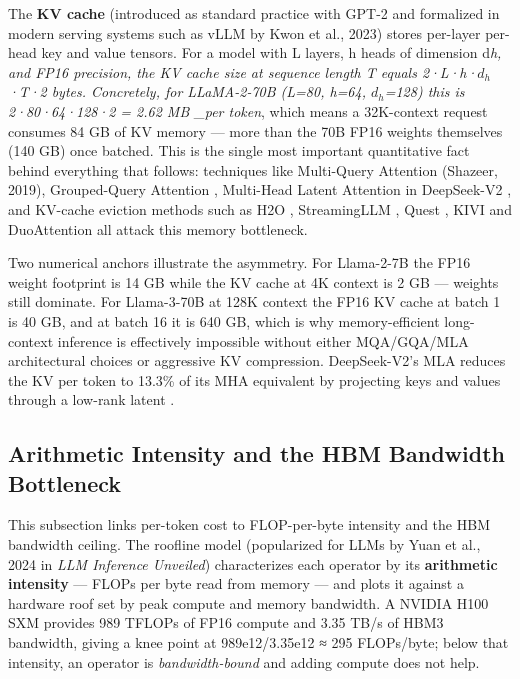 \documentclass{article}
\begin{document}
The \textbf{KV cache} (introduced as standard practice with GPT-2 and formalized in modern serving systems such as vLLM by Kwon et al., 2023) stores per-layer per-head key and value tensors. For a model with L layers, h heads of dimension d\emph{h, and FP16 precision, the KV cache size at sequence length T equals 2·L·h·\(d_h\)·T·2 bytes. Concretely, for LLaMA-2-70B (L=80, h=64, \(d_h\)=128) this is 2·80·64·128·2 = 2.62 MB \_per token}, which means a 32K-context request consumes 84 GB of KV memory --- more than the 70B FP16 weights themselves (140 GB) once batched. This is the single most important quantitative fact behind everything that follows: techniques like Multi-Query Attention (Shazeer, 2019), Grouped-Query Attention \citep{ainslie20232023}, Multi-Head Latent Attention in DeepSeek-V2 \citep{liu20242024}, and KV-cache eviction methods such as H2O \citep{zhang20232023}, StreamingLLM \citep{xiao2024efficientstreaming}, Quest \citep{tang20242024}, KIVI \citep{liu20242024} and DuoAttention \citep{xiao2024efficientstreaming} all attack this memory bottleneck.

Two numerical anchors illustrate the asymmetry. For Llama-2-7B the FP16 weight footprint is 14 GB while the KV cache at 4K context is 2 GB --- weights still dominate. For Llama-3-70B at 128K context the FP16 KV cache at batch 1 is 40 GB, and at batch 16 it is 640 GB, which is why memory-efficient long-context inference is effectively impossible without either MQA/GQA/MLA architectural choices or aggressive KV compression. DeepSeek-V2's MLA reduces the KV per token to 13.3\% of its MHA equivalent by projecting keys and values through a low-rank latent \citep{liu20242024}.

\subsection{Arithmetic Intensity and the HBM Bandwidth Bottleneck}\label{arithmetic-intensity-and-the-hbm-bandwidth-bottleneck}

This subsection links per-token cost to FLOP-per-byte intensity and the HBM bandwidth ceiling. The roofline model (popularized for LLMs by Yuan et al., 2024 in \emph{LLM Inference Unveiled}) characterizes each operator by its \textbf{arithmetic intensity} --- FLOPs per byte read from memory --- and plots it against a hardware roof set by peak compute and memory bandwidth. A NVIDIA H100 SXM provides 989 TFLOPs of FP16 compute and 3.35 TB/s of HBM3 bandwidth, giving a knee point at 989e12/3.35e12 ≈ 295 FLOPs/byte; below that intensity, an operator is \emph{bandwidth-bound} and adding compute does not help.
\end{document}

